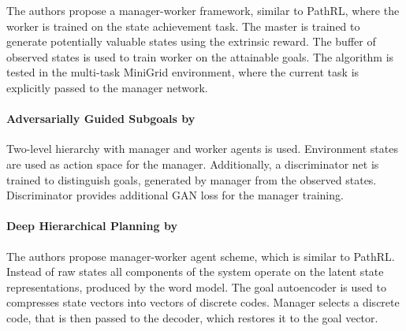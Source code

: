 \documentclass[acmsmall, nonacm]{acmart}
\begin{document}
The authors propose a manager-worker framework, similar to PathRL, where the worker is trained on the state achievement task. The master is trained to generate potentially valuable states using the extrinsic reward. The buffer of observed states is used to train worker on the attainable goals. The algorithm is tested in the multi-task MiniGrid environment, where the current task is explicitly passed to the manager network.


\paragraph{Adversarially Guided Subgoals by \citet{https://doi.org/10.48550/arxiv.2201.09635}}

Two-level hierarchy with manager and worker agents is used. Environment states are used as action space for the manager. Additionally, a discriminator net is trained to distinguish goals, generated by manager from the observed states. Discriminator provides additional GAN loss for the manager training.


\paragraph{Deep Hierarchical Planning by \citet{https://doi.org/10.48550/arxiv.2206.04114}}

The authors propose manager-worker agent scheme, which is similar to PathRL. Instead of raw states all components of the system operate on the latent state representations, produced by the word model. The goal autoencoder is used to compresses state vectors into vectors of discrete codes. Manager selects a discrete code, that is then passed to the decoder, which restores it to the goal vector.


\medskip



\end{document}
